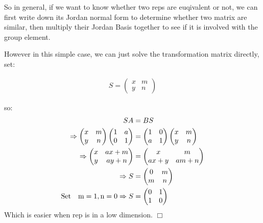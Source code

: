 \documentclass[]{ctexart}
\begin{document}
    So in general, if we want to know whether two reps are euqivalent or not, we can first write down its Jordan normal form to determine whether two matrix are similar, then multiply their Jordan Basis together to see if it is involved with the group element. 
    
    However in this simple case, we can just solve the transformation matrix directly, set:
    
    \begin{equation*}
    \begin{aligned}
    S=
    \begin{pmatrix}
    x & m\\
    y & n
    \end{pmatrix}
    \end{aligned}
    \end{equation*}
    
    so:
    \begin{equation*}
    \begin{aligned}
    SA&=BS\\
    \Rightarrow \begin{pmatrix}
    x & m\\
    y & n
    \end{pmatrix}
    \begin{pmatrix}
    1 & a\\
    0 & 1
    \end{pmatrix}
    &=
    \begin{pmatrix}
    1 & 0\\
    a & 1
    \end{pmatrix}
    \begin{pmatrix}
    x & m\\
    y & n
    \end{pmatrix}\\
    \Rightarrow \begin{pmatrix}
    x & ax+m\\
    y & ay+n
    \end{pmatrix}
    &=
    \begin{pmatrix}
    x & m\\
    ax+y & am+n
    \end{pmatrix}\\
    \Rightarrow S&=
    \begin{pmatrix}
    0 & m\\
    m & n
    \end{pmatrix}\\
    {\rm Set\quad  m=1,n=0}\Rightarrow S&=
    \begin{pmatrix}
    0 & 1\\
    1 & 0
    \end{pmatrix}
    \end{aligned}
    \end{equation*}
    Which is easier when rep is in a low dimension. \qquad $ \Box $ 
    
\end{document}
